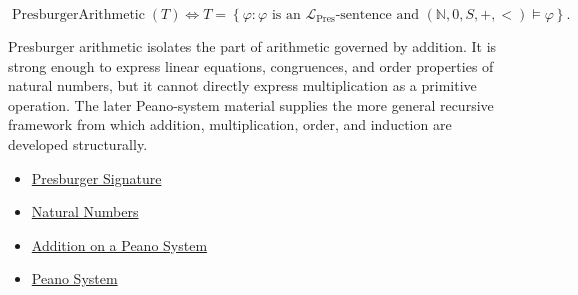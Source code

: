 \begin{remark*}
\[
\operatorname{PresburgerArithmetic}(T)
\Longleftrightarrow
T=
\left\{
\varphi:
\varphi \text{ is an }\mathcal L_{\mathrm{Pres}}\text{-sentence and }
(\mathbb{N},0,S,+,<)\models\varphi
\right\}.
\]
\end{remark*}

\begin{remark*}[Interpretation]
Presburger arithmetic isolates the part of arithmetic governed by addition.
It is strong enough to express linear equations, congruences, and order
properties of natural numbers, but it cannot directly express multiplication
as a primitive operation. The later Peano-system material supplies the more
general recursive framework from which addition, multiplication, order, and
induction are developed structurally.
\end{remark*}

\begin{dependencies}
\begin{itemize}
  \item \hyperref[def:presburger-signature]{Presburger Signature}
  \item \hyperref[def:natural-numbers]{Natural Numbers}
  \item \hyperref[def:addition-on-peano-system]{Addition on a Peano System}
  \item \hyperref[def:peano-system]{Peano System}
\end{itemize}
\end{dependencies}
